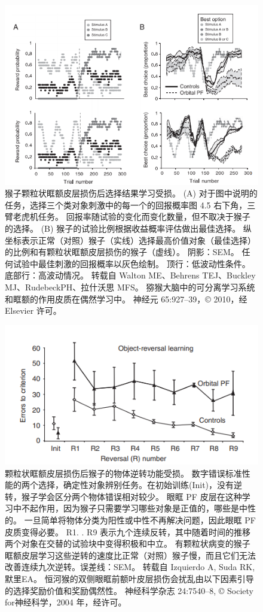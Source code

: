 \begin{figure}[!htb]
	\centering
	\includegraphics{image_pfc/Fig_4_6}
	\caption{猴子颗粒状眶额皮层损伤后选择结果学习受损。 (A) 对于图中说明的任务，选择三个类对象刺激中的每一个的回报概率图 4.5 右下角，三臂老虎机任务。 回报率随试验的变化而变化数量，但不取决于猴子的选择。 (B) 猴子的试验比例根据收益概率评估做出最佳选择。 纵坐标表示正常（对照）猴子（实线）选择最高价值对象（最佳选择）的比例和有颗粒状眶额皮层损伤的猴子（虚线）。 阴影：SEM。 任何试验中最佳刺激的回报概率以灰色绘制。 顶行：低波动性条件。 底部行：高波动情况。 转载自 Walton ME、Behrens TEJ、Buckley MJ、RudebeckPH、拉什沃思 MFS。 猕猴大脑中的可分离学习系统和眶额的作用皮质在偶然学习中。 神经元 65:927–39，© 2010，经 Elsevier 许可。}
	\label{fig:fig_4_6}
\end{figure}


\begin{figure}[!htb]
	\centering
	\includegraphics{image_pfc/Fig_4_7}
	\caption{颗粒状眶额皮层损伤后猴子的物体逆转功能受损。 数字错误标准性能的两个选择，确定性对象辨别任务。在初始训练(Init)，没有逆转，猴子学会区分两个物体错误相对较少。 眼眶 PF 皮层在这种学习中不起作用，因为猴子只需要学习哪些对象是正值的，哪些是中性的。 一旦简单将物体分类为阳性或中性不再解决问题，因此眼眶 PF皮质变得必要。 R1. . R9 表示九个连续反转，其中随着时间的推移两个对象在交替的试验块中变得积极和中立。 有颗粒状病变的猴子眶额皮层学习这些逆转的速度比正常（对照）猴子慢，而且它们无法改善连续九次逆转。误差线：SEM。 转载自 Izquierdo A, Suda RK,默里EA。 恒河猴的双侧眼眶前额叶皮层损伤会扰乱由以下因素引导的选择奖励价值和奖励偶然性。 神经科学杂志 24:7540–8, © Society for神经科学，2004 年，经许可。}
	\label{fig:fig_4_7}
\end{figure}


